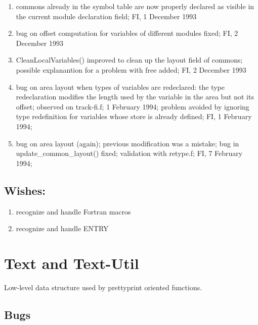 \begin{enumerate}
  \item commons already in the symbol table are now properly declared as
	visible in the current module declaration field; FI, 1 December 1993

  \item bug on offset computation for variables of different modules
	fixed; FI, 2 December 1993

  \item CleanLocalVariables() improved to clean up the layout field of
	commons; possible explanantion for a problem with free added;
	FI, 2 December 1993

  \item bug on area layout when types of variables are redeclared: the
	type redeclaration modifies the length used by the variable in
	the area but not its offset; observed on track-fi.f; 1 February
	1994; problem avoided by ignoring type redefinition for
	variables whose store is already defined; FI, 1 February 1994;

  \item bug on area layout (again); previous modification was a mistake;
	bug in update_common_layout() fixed; validation with retype.f;
	FI, 7 February 1994;

\end{enumerate}

\subsection{Wishes:}

\begin{enumerate}

  \item recognize and handle Fortran macros

  \item recognize and handle ENTRY

\end{enumerate}

\section{Text and Text-Util}

Low-level data structure used by prettyprint oriented functions.

\subsection{Bugs}

